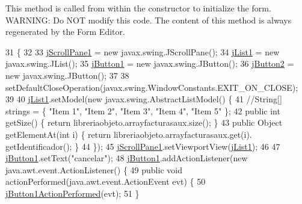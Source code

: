 This method is called from within the constructor to initialize the form. W\+A\+R\+N\+I\+NG\+: Do N\+OT modify this code. The content of this method is always regenerated by the Form Editor. 
\begin{DoxyCode}
31                                   \{
32 
33         \mbox{\hyperlink{class_interfaz_package_1_1_lista_facturas_a3963a695019cd45a2b9559b6a31530ef}{jScrollPane1}} = \textcolor{keyword}{new} javax.swing.JScrollPane();
34         \mbox{\hyperlink{class_interfaz_package_1_1_lista_facturas_a92c3e7b820b65782c261920bbc6af073}{jList1}} = \textcolor{keyword}{new} javax.swing.JList();
35         \mbox{\hyperlink{class_interfaz_package_1_1_lista_facturas_af1f1a335b42683dc72b7096d9c5612b5}{jButton1}} = \textcolor{keyword}{new} javax.swing.JButton();
36         \mbox{\hyperlink{class_interfaz_package_1_1_lista_facturas_a099e7867e628d252ed807ea6bd95dea1}{jButton2}} = \textcolor{keyword}{new} javax.swing.JButton();
37 
38         setDefaultCloseOperation(javax.swing.WindowConstants.EXIT\_ON\_CLOSE);
39 
40         \mbox{\hyperlink{class_interfaz_package_1_1_lista_facturas_a92c3e7b820b65782c261920bbc6af073}{jList1}}.setModel(\textcolor{keyword}{new} javax.swing.AbstractListModel() \{
41             \textcolor{comment}{//String[] strings = \{ "Item 1", "Item 2", "Item 3", "Item 4", "Item 5" \};}
42             \textcolor{keyword}{public} \textcolor{keywordtype}{int} getSize() \{ \textcolor{keywordflow}{return} libreriaobjeto.arrayfacturasaux.size(); \}
43             \textcolor{keyword}{public} Object getElementAt(\textcolor{keywordtype}{int} i) \{ \textcolor{keywordflow}{return} libreriaobjeto.arrayfacturasaux.get(i).
      getIdentificador(); \}
44         \});
45         \mbox{\hyperlink{class_interfaz_package_1_1_lista_facturas_a3963a695019cd45a2b9559b6a31530ef}{jScrollPane1}}.setViewportView(\mbox{\hyperlink{class_interfaz_package_1_1_lista_facturas_a92c3e7b820b65782c261920bbc6af073}{jList1}});
46 
47         \mbox{\hyperlink{class_interfaz_package_1_1_lista_facturas_af1f1a335b42683dc72b7096d9c5612b5}{jButton1}}.setText(\textcolor{stringliteral}{"cancelar"});
48         \mbox{\hyperlink{class_interfaz_package_1_1_lista_facturas_af1f1a335b42683dc72b7096d9c5612b5}{jButton1}}.addActionListener(\textcolor{keyword}{new} java.awt.event.ActionListener() \{
49             \textcolor{keyword}{public} \textcolor{keywordtype}{void} actionPerformed(java.awt.event.ActionEvent evt) \{
50                 \mbox{\hyperlink{class_interfaz_package_1_1_lista_facturas_ae41b741de1678a6ab365994321b47a87}{jButton1ActionPerformed}}(evt);
51             \}

\end{DoxyCode}
